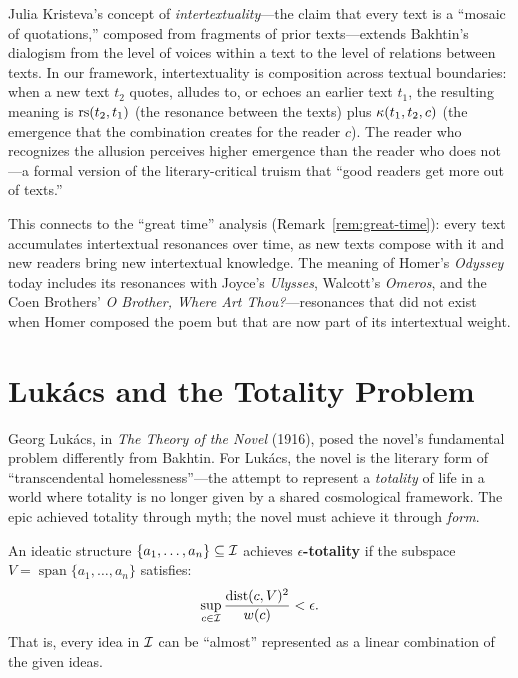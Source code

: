\begin{remark}
\label{rem:intertextuality}
Julia Kristeva's concept of \emph{intertextuality}---the claim that every text is a ``mosaic of quotations,'' composed from fragments of prior texts---extends Bakhtin's dialogism from the level of voices within a text to the level of relations between texts.  In our framework, intertextuality is composition across textual boundaries: when a new text $t_2$ quotes, alludes to, or echoes an earlier text $t_1$, the resulting meaning is $\mathrm{rs}(t_2, t_1)$ (the resonance between the texts) plus $\kappa(t_1, t_2, c)$ (the emergence that the combination creates for the reader $c$).  The reader who recognizes the allusion perceives higher emergence than the reader who does not---a formal version of the literary-critical truism that ``good readers get more out of texts.''

This connects to the ``great time'' analysis (Remark~\ref{rem:great-time}): every text accumulates intertextual resonances over time, as new texts compose with it and new readers bring new intertextual knowledge.  The meaning of Homer's \textit{Odyssey} today includes its resonances with Joyce's \textit{Ulysses}, Walcott's \textit{Omeros}, and the Coen Brothers' \textit{O Brother, Where Art Thou?}---resonances that did not exist when Homer composed the poem but that are now part of its intertextual weight.
\end{remark}


\section{Luk\'acs and the Totality Problem}

Georg Luk\'acs, in \emph{The Theory of the Novel} (1916), posed the novel's
fundamental problem differently from Bakhtin.  For Luk\'acs, the novel is the
literary form of ``transcendental homelessness''---the attempt to represent
a \emph{totality} of life in a world where totality is no longer given by a
shared cosmological framework.  The epic achieved totality through myth; the
novel must achieve it through \emph{form}.

\begin{definition}
\label{def:totality}
An ideatic structure $\{a_1, \ldots, a_n\} \subseteq \mathcal{I}$ achieves
\textbf{$\epsilon$-totality} if the subspace
$V = \operatorname{span}\{a_1, \ldots, a_n\}$ satisfies:
\[
  \sup_{c \in \mathcal{I}} \frac{\operatorname{dist}(c, V)^2}{w(c)} < \epsilon.
\]
That is, every idea in $\mathcal{I}$ can be ``almost'' represented as a linear
combination of the given ideas.
\end{definition}

